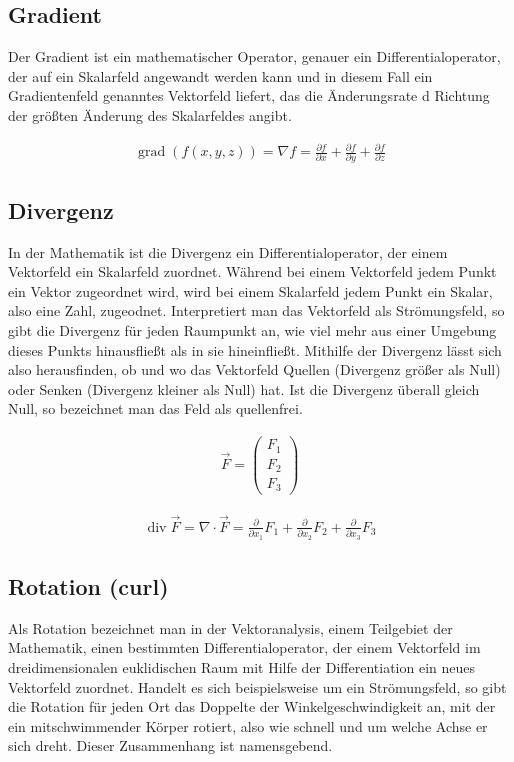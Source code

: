 \documentclass[a4paper]{scrartcl}
\begin{document}
\subsection{Gradient}
Der Gradient ist ein mathematischer Operator, genauer ein Differentialoperator,
der auf ein Skalarfeld angewandt werden kann und in diesem Fall ein
Gradientenfeld genanntes Vektorfeld liefert, das die Änderungsrate d Richtung
der größten Änderung des Skalarfeldes angibt.

\begin{align}
\operatorname{grad}(f(x,y,z)) = \nabla f = \frac{{\partial f}}{{\partial x}} +
\frac{{\partial f}}{{\partial y}} + \frac{{\partial f}}{{\partial z}} 
\end{align}
\subsection{Divergenz}
In der Mathematik ist die Divergenz ein Differentialoperator, der einem
Vektorfeld ein Skalarfeld zuordnet. Während bei einem Vektorfeld jedem Punkt ein
Vektor zugeordnet wird, wird bei einem Skalarfeld jedem Punkt ein Skalar, also
eine Zahl, zugeodnet. Interpretiert man das Vektorfeld als Strömungsfeld, so
gibt die Divergenz für jeden Raumpunkt an, wie viel mehr aus einer Umgebung
dieses Punkts hinausfließt als in sie hineinfließt. Mithilfe der Divergenz lässt
sich also herausfinden, ob und wo das Vektorfeld Quellen (Divergenz größer als
Null) oder Senken (Divergenz kleiner als Null) hat. Ist die Divergenz überall
gleich Null, so bezeichnet man das Feld als quellenfrei.

\begin{align}
\vec F = \begin{pmatrix} F_1 \\ F_2 \\ F_3 \end{pmatrix}
\end{align}

\begin{align}
\operatorname{div}\vec F = \nabla \cdot \vec F =
\frac{\partial}{\partial x_1}F_1 + \frac{\partial}{\partial x_2}F_2+ \frac{\partial}{\partial x_3}F_3
\end{align}

\subsection{Rotation (curl)}
Als Rotation bezeichnet man in der Vektoranalysis, einem Teilgebiet der
Mathematik, einen bestimmten Differentialoperator, der einem Vektorfeld im
dreidimensionalen euklidischen Raum mit Hilfe der Differentiation ein neues
Vektorfeld zuordnet. Handelt es sich beispielsweise um ein Strömungsfeld, so
gibt die Rotation für jeden Ort das Doppelte der Winkelgeschwindigkeit an, mit
der ein mitschwimmender Körper rotiert, also wie schnell und um welche Achse er
sich dreht. Dieser Zusammenhang ist namensgebend.
\end{document}
